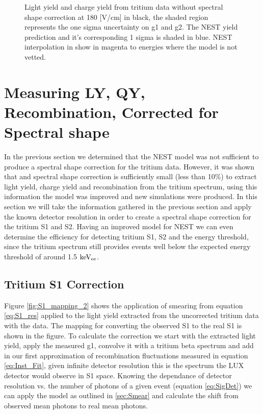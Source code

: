 \begin{figure}[h!]
\caption{Light yield and charge yield from tritium data without spectral shape correction at 180 [V/cm] in black, the shaded region represents the one sigma uncertainty on g1 and g2. The NEST yield prediction and it's corresponding 1 sigma is shaded in blue. NEST interpolation in show in magenta to energies where the model is not vetted. }
\label{fig:LYQY_iter0}
\end{figure}
\renewcommand{\baselinestretch}{2}
\small\normalsize


\newpage

\section{Measuring LY, QY, Recombination, Corrected for Spectral shape}

In the previous section we determined that the NEST model was not sufficient to produce a spectral shape correction for the tritium data. However, it was shown that and spectral shape correction is sufficiently small (less than 10\%) to extract light yield, charge yield and recombination from the tritium spectrum, using this information the model was improved and new simulations were produced. In this section we will take the information gathered in the previous section and apply the known detector resolution in order to create a spectral shape correction for the tritium S1 and S2. Having an improved model for NEST we can even determine the efficiency for  detecting tritium S1, S2 and the energy threshold, since the tritium spectrum still provides events well below the expected energy threshold of around 1.5 $\rm keV_{ee}$.


\subsection{Tritium S1 Correction}

Figure \ref{fig:S1_mapping_2} shows the application of smearing  from equation \ref{eq:S1_res} applied to the light yield extracted from the uncorrected tritium data with the data. The mapping for converting the observed S1 to the real S1 is shown in the figure. To calculate the correction we start with the extracted light yield, apply the measured g1, convolve it with a tritium beta spectrum and add in our first approximation of recombination fluctuations measured in equation \ref{eq:Inst_Fit}, given infinite detector resolution this is the spectrum the LUX detector would observe in S1 space. Knowing the dependance of detector resolution vs. the number of photons of a given event (equation \ref{eq:SigDet}) we can apply the model as outlined in \ref{sec:Smear} and calculate the shift from observed mean photons to real mean photons.

